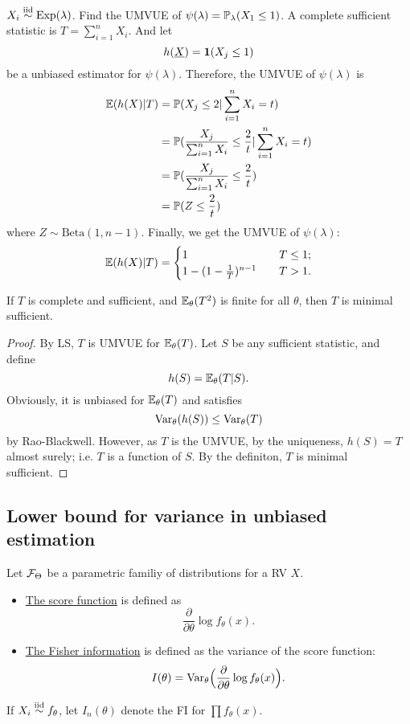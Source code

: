 \begin{exap}
	$X_i \stackrel{\text{iid}}{\sim} \mathrm{Exp}(\lambda)$. Find the UMVUE of $\psi(\lambda) = \mathbb{P}_\lambda(X_1 \leq 1)$. A complete sufficient statistic is $T = \sum_{i=1}^n X_i$. And let 
	$$h(\underline{X}) = \boldsymbol{1}(X_j \leq 1)$$
	be a unbiased estimator for $\psi(\lambda)$. Therefore, the UMVUE of $\psi(\lambda)$ is 
	\begin{align*}
		\mathbb{E}(h(X)| T) & = \mathbb{P}( X_j \leq 2 | \sum_{i=1}^n X_i =t ) \\
		&= \mathbb{P}( \frac{X_j}{ \sum_{i=1}^n X_i } \leq \frac{2}{t} | \sum_{i=1}^n X_i =t ) \\
		&= \mathbb{P}( \frac{X_j}{ \sum_{i=1}^n X_i } \leq \frac{2}{t}) \\
		&= \mathbb{P}( Z \leq \frac{2}{t} )
	\end{align*}
	where $Z \sim \mathrm{Beta}(1, n-1)$. Finally, we get the UMVUE of $\psi(\lambda)$:
	$$\mathbb{E}(h(X)| T) = \begin{cases}
	1 &\quad T\leq 1; \\
	1 - (1 - \frac{1}{T})^{n-1} &\quad T>1.
	\end{cases}$$ 
\end{exap}

\begin{prop}
	If $T$ is complete and sufficient, and $\mathbb{E}_\theta (T^2)$ is finite for all $\theta$, then $T$ is minimal sufficient.
\end{prop}
\begin{proof}
	By LS, $T$ is UMVUE for $\mathbb{E}_\theta (T)$. Let $S$ be any sufficient statistic, and define 
	$$h(S) = \mathbb{E}_\theta (T|S).$$
	Obviously, it is unbiased for $\mathbb{E}_\theta (T)$ and satisfies
	$$\mathrm{Var}_\theta (h(S)) \leq \mathrm{Var} _\theta (T)$$
	by Rao-Blackwell. However, as $T$ is the UMVUE, by the uniqueness, $h(S) = T$ almost surely; i.e. $T$ is a function of $S$. By the definiton, $T$ is minimal sufficient. 
\end{proof}

\subsection{Lower bound for variance in unbiased estimation}
\begin{mydef}Let $\mathcal{F}_\Theta$ be a parametric familiy of distributions for a RV $X$.
	\begin{itemize}
		\item \underline{The score function} is defined as 
		$$\frac{\partial}{\partial \theta} \log f_\theta (x).$$
		\item \underline{The Fisher information} is defined as the variance of the score function:
		$$I(\theta) = \mathrm{Var}_\theta \Big( \frac{\partial}{\partial \theta} \log f_\theta (x) \Big).$$
	\end{itemize}
\end{mydef}
\begin{remark}
	If $X_i \stackrel{\text{iid}}{\sim} f_\theta$, let $I_n(\theta)$ denote the FI for $\prod f_\theta (x)$. 
\end{remark}

